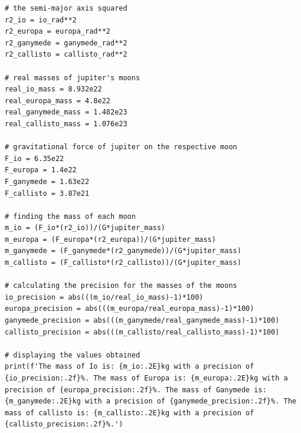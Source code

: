 \documentclass[12pt, a4paper]{article}
\begin{document}
\begin{verbatim}
# the semi-major axis squared
r2_io = io_rad**2
r2_europa = europa_rad**2
r2_ganymede = ganymede_rad**2
r2_callisto = callisto_rad**2

# real masses of jupiter's moons
real_io_mass = 8.932e22
real_europa_mass = 4.8e22
real_ganymede_mass = 1.482e23
real_callisto_mass = 1.076e23

# gravitational force of jupiter on the respective moon
F_io = 6.35e22
F_europa = 1.4e22
F_ganymede = 1.63e22
F_callisto = 3.87e21

# finding the mass of each moon
m_io = (F_io*(r2_io))/(G*jupiter_mass)
m_europa = (F_europa*(r2_europa))/(G*jupiter_mass)
m_ganymede = (F_ganymede*(r2_ganymede))/(G*jupiter_mass)
m_callisto = (F_callisto*(r2_callisto))/(G*jupiter_mass)

# calculating the precision for the masses of the moons
io_precision = abs(((m_io/real_io_mass)-1)*100)
europa_precision = abs(((m_europa/real_europa_mass)-1)*100)
ganymede_precision = abs(((m_ganymede/real_ganymede_mass)-1)*100)
callisto_precision = abs(((m_callisto/real_callisto_mass)-1)*100)

# displaying the values obtained
print(f'The mass of Io is: {m_io:.2E}kg with a precision of {io_precision:.2f}%. The mass of Europa is: {m_europa:.2E}kg with a precision of {europa_precision:.2f}%. The mass of Ganymede is: {m_ganymede:.2E}kg with a precision of {ganymede_precision:.2f}%. The mass of callisto is: {m_callisto:.2E}kg with a precision of {callisto_precision:.2f}%.')

\end{verbatim}
\end{document}
